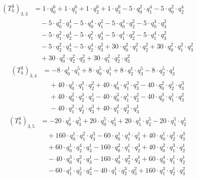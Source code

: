 \begin{align*}(T_{h}^3)_{3,3}&=1\cdot q_0^{6}+1\cdot q_1^{6}+1\cdot q_2^{6}+1\cdot q_3^{6}-5\cdot q_0^{2}\cdot q_1^{4}-5\cdot q_0^{2}\cdot q_2^{4}\\
&\quad -5\cdot q_0^{2}\cdot q_3^{4}-5\cdot q_0^{4}\cdot q_1^{2}-5\cdot q_0^{4}\cdot q_2^{2}-5\cdot q_0^{4}\cdot q_3^{2}\\
&\quad -5\cdot q_1^{2}\cdot q_2^{4}-5\cdot q_1^{2}\cdot q_3^{4}-5\cdot q_1^{4}\cdot q_2^{2}-5\cdot q_1^{4}\cdot q_3^{2}\\
&\quad -5\cdot q_2^{2}\cdot q_3^{4}-5\cdot q_2^{4}\cdot q_3^{2}+30\cdot q_0^{2}\cdot q_1^{2}\cdot q_2^{2}+30\cdot q_0^{2}\cdot q_1^{2}\cdot q_3^{2}\\
&\quad +30\cdot q_0^{2}\cdot q_2^{2}\cdot q_3^{2}+30\cdot q_1^{2}\cdot q_2^{2}\cdot q_3^{2}\end{align*}
\begin{align*}(T_{h}^3)_{3,4}&=-8\cdot q_0^{1}\cdot q_1^{5}+8\cdot q_0^{5}\cdot q_1^{1}+8\cdot q_2^{1}\cdot q_3^{5}-8\cdot q_2^{5}\cdot q_3^{1}\\
&\quad +40\cdot q_0^{1}\cdot q_1^{3}\cdot q_2^{2}+40\cdot q_0^{1}\cdot q_1^{3}\cdot q_3^{2}-40\cdot q_0^{2}\cdot q_2^{1}\cdot q_3^{3}\\
&\quad +40\cdot q_0^{2}\cdot q_2^{3}\cdot q_3^{1}-40\cdot q_0^{3}\cdot q_1^{1}\cdot q_2^{2}-40\cdot q_0^{3}\cdot q_1^{1}\cdot q_3^{2}\\
&\quad -40\cdot q_1^{2}\cdot q_2^{1}\cdot q_3^{3}+40\cdot q_1^{2}\cdot q_2^{3}\cdot q_3^{1}\end{align*}
\begin{align*}(T_{h}^3)_{3,5}&=-20\cdot q_0^{1}\cdot q_3^{5}+20\cdot q_0^{5}\cdot q_3^{1}+20\cdot q_1^{1}\cdot q_2^{5}-20\cdot q_1^{5}\cdot q_2^{1}\\
&\quad +160\cdot q_0^{1}\cdot q_1^{2}\cdot q_3^{3}-60\cdot q_0^{1}\cdot q_1^{4}\cdot q_3^{1}+40\cdot q_0^{1}\cdot q_2^{2}\cdot q_3^{3}\\
&\quad +60\cdot q_0^{1}\cdot q_2^{4}\cdot q_3^{1}-160\cdot q_0^{2}\cdot q_1^{1}\cdot q_2^{3}+40\cdot q_0^{2}\cdot q_1^{3}\cdot q_2^{1}\\
&\quad -40\cdot q_0^{3}\cdot q_1^{2}\cdot q_3^{1}-160\cdot q_0^{3}\cdot q_2^{2}\cdot q_3^{1}+60\cdot q_0^{4}\cdot q_1^{1}\cdot q_2^{1}\\
&\quad -60\cdot q_1^{1}\cdot q_2^{1}\cdot q_3^{4}-40\cdot q_1^{1}\cdot q_2^{3}\cdot q_3^{2}+160\cdot q_1^{3}\cdot q_2^{1}\cdot q_3^{2}\end{align*}
